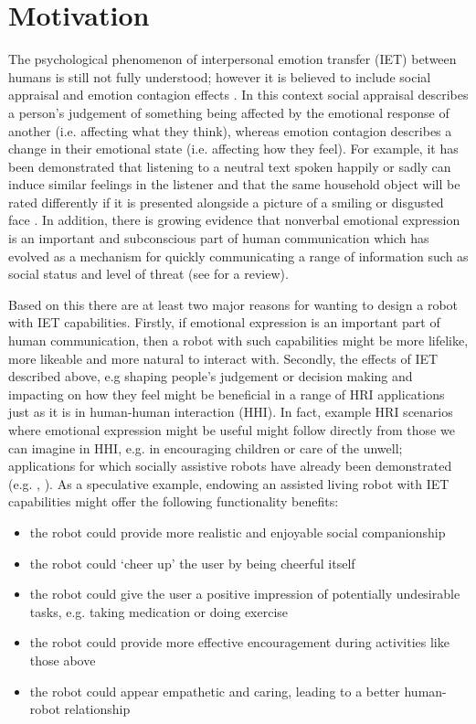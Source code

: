 \documentclass[11pt]{article}
\begin{document}
\section{Motivation}
The psychological phenomenon of interpersonal emotion transfer (IET) between humans is still not fully understood; however it is believed to include social appraisal and emotion contagion effects \cite{parkinson2011interpersonal}. In this context social appraisal describes a person's judgement of something being affected by the emotional response of another (i.e. affecting what they think), whereas emotion contagion describes a change in their emotional state (i.e. affecting how they feel). For example, it has been demonstrated that listening to a neutral text spoken happily or sadly can induce similar feelings in the listener \cite{neumann2000mood} and that the same household object will be rated differently if it is presented alongside a picture of a smiling or disgusted face \cite{bayliss2007affective}. In addition, there is growing evidence that nonverbal emotional expression is an important and subconscious part of human communication which has evolved as a mechanism for quickly communicating a range of information such as social status and level of threat (see \cite{tracy2015nonverbal} for a review). 

Based on this there are at least two major reasons for wanting to design a robot with IET capabilities. Firstly, if emotional expression is an important part of human communication, then a robot with such capabilities might be more lifelike, more likeable and more natural to interact with. Secondly, the effects of IET described above, e.g shaping people's judgement or decision making and impacting on how they feel might be beneficial in a range of HRI applications just as it is in human-human interaction (HHI). In fact, example HRI scenarios where emotional expression might be useful might follow directly from those we can imagine in HHI, e.g. in encouraging children or care of the unwell; applications for which socially assistive robots have already been demonstrated (e.g. \cite{shiomi2015can}, \cite{gockley2006encouraging}). As a speculative example, endowing an assisted living robot with IET  capabilities might offer the following functionality benefits: 
\begin{itemize}
\item the robot could provide more realistic and enjoyable social companionship
\item the robot could `cheer up' the user by being cheerful itself
\item the robot could give the user a positive impression of potentially undesirable tasks, e.g. taking medication or doing exercise
\item the robot could provide more effective encouragement during activities like those above
\item the robot could appear empathetic and caring, leading to a better human-robot relationship
\end{itemize}
\end{document}
